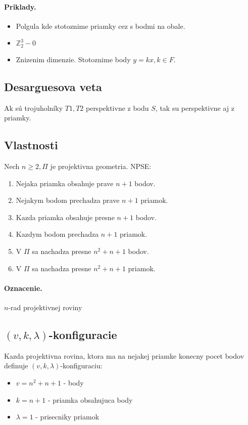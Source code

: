 \documentclass[10pt,a4paper]{article}
\begin{document}
\paragraph{Priklady.}
\begin{itemize}
\item Polgula kde stotoznime priamky cez s bodmi na obale. 
\item $\mathbb{Z}_2^3 - {0}$
\item Znizenim dimenzie. Stotoznime body $y = kx, k \in F$.
\end{itemize}

\subsection{Desarguesova veta}
Ak sú trojuholníky $T1, T2$ perspektivne z bodu $S$, tak su perspektivne aj z priamky. 

\subsection{Vlastnosti}
Nech $n\geq 2, \Pi $ je projektivna geometria. NPSE:
\begin{enumerate}
\item Nejaka priamka obsahuje prave $n+1$ bodov.
\item Nejakym bodom prechadza prave $n+1$ priamok. 
\item Kazda priamka obsahuje presne $n+1$ bodov. 
\item Kazdym bodom prechadza $n+1$ priamok.
\item V $\Pi$ sa nachadza presne $n^2+n+1$ bodov. 
\item V $\Pi$ sa nachadza presne $n^2+n+1$ priamok. 
\end{enumerate}

\paragraph{Oznacenie.}
$n$-rad projektivnej roviny

\subsection{$(v,k,\lambda)$-konfiguracie}
Kazda projektivna rovina, ktora ma na nejakej priamke konecny pocet bodov definuje $(v, k, \lambda)$-konfiguraciu:
\begin{itemize}
\item $v=n^2+n+1$ - body
\item $k=n+1$ - priamka obsahujuca body
\item $\lambda=1$ - prisecniky priamok
\end{itemize}
\end{document}
